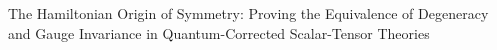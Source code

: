 \documentclass[twocolumn]{aastex631}
\begin{document}
The Hamiltonian Origin of Symmetry: Proving the Equivalence of Degeneracy and Gauge Invariance in Quantum-Corrected Scalar-Tensor Theories
\end{document}
